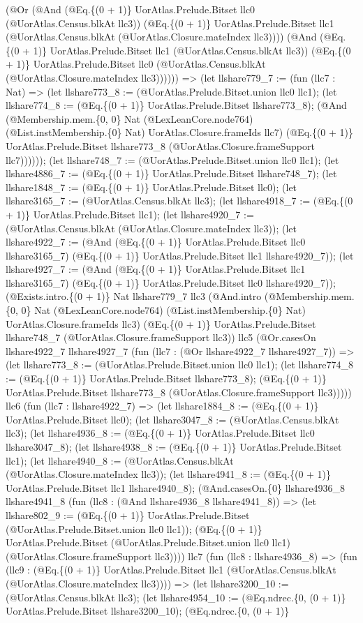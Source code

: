 \documentclass[11pt]{article}
\begin{document}
(@Or (@And (@Eq.\{(0 + 1)\} UorAtlas.Prelude.Bitset llc0 (@UorAtlas.Census.blkAt llc3)) (@Eq.\{(0 + 1)\} UorAtlas.Prelude.Bitset llc1 (@UorAtlas.Census.blkAt (@UorAtlas.Closure.mateIndex llc3)))) (@And (@Eq.\{(0 + 1)\} UorAtlas.Prelude.Bitset llc1 (@UorAtlas.Census.blkAt llc3)) (@Eq.\{(0 + 1)\} UorAtlas.Prelude.Bitset llc0 (@UorAtlas.Census.blkAt (@UorAtlas.Closure.mateIndex llc3)))))) => (let llshare779\_7 := (fun (llc7 : Nat) => (let llshare773\_8 := (@UorAtlas.Prelude.Bitset.union llc0 llc1); (let llshare774\_8 := (@Eq.\{(0 + 1)\} UorAtlas.Prelude.Bitset llshare773\_8); (@And (@Membership.mem.\{0, 0\} Nat (@LexLeanCore.node764) (@List.instMembership.\{0\} Nat) UorAtlas.Closure.frameIds llc7) (@Eq.\{(0 + 1)\} UorAtlas.Prelude.Bitset llshare773\_8 (@UorAtlas.Closure.frameSupport llc7)))))); (let llshare748\_7 := (@UorAtlas.Prelude.Bitset.union llc0 llc1); (let llshare4886\_7 := (@Eq.\{(0 + 1)\} UorAtlas.Prelude.Bitset llshare748\_7); (let llshare1848\_7 := (@Eq.\{(0 + 1)\} UorAtlas.Prelude.Bitset llc0); (let llshare3165\_7 := (@UorAtlas.Census.blkAt llc3); (let llshare4918\_7 := (@Eq.\{(0 + 1)\} UorAtlas.Prelude.Bitset llc1); (let llshare4920\_7 := (@UorAtlas.Census.blkAt (@UorAtlas.Closure.mateIndex llc3)); (let llshare4922\_7 := (@And (@Eq.\{(0 + 1)\} UorAtlas.Prelude.Bitset llc0 llshare3165\_7) (@Eq.\{(0 + 1)\} UorAtlas.Prelude.Bitset llc1 llshare4920\_7)); (let llshare4927\_7 := (@And (@Eq.\{(0 + 1)\} UorAtlas.Prelude.Bitset llc1 llshare3165\_7) (@Eq.\{(0 + 1)\} UorAtlas.Prelude.Bitset llc0 llshare4920\_7)); (@Exists.intro.\{(0 + 1)\} Nat llshare779\_7 llc3 (@And.intro (@Membership.mem.\{0, 0\} Nat (@LexLeanCore.node764) (@List.instMembership.\{0\} Nat) UorAtlas.Closure.frameIds llc3) (@Eq.\{(0 + 1)\} UorAtlas.Prelude.Bitset llshare748\_7 (@UorAtlas.Closure.frameSupport llc3)) llc5 (@Or.casesOn llshare4922\_7 llshare4927\_7 (fun (llc7 : (@Or llshare4922\_7 llshare4927\_7)) => (let llshare773\_8 := (@UorAtlas.Prelude.Bitset.union llc0 llc1); (let llshare774\_8 := (@Eq.\{(0 + 1)\} UorAtlas.Prelude.Bitset llshare773\_8); (@Eq.\{(0 + 1)\} UorAtlas.Prelude.Bitset llshare773\_8 (@UorAtlas.Closure.frameSupport llc3))))) llc6 (fun (llc7 : llshare4922\_7) => (let llshare1884\_8 := (@Eq.\{(0 + 1)\} UorAtlas.Prelude.Bitset llc0); (let llshare3047\_8 := (@UorAtlas.Census.blkAt llc3); (let llshare4936\_8 := (@Eq.\{(0 + 1)\} UorAtlas.Prelude.Bitset llc0 llshare3047\_8); (let llshare4938\_8 := (@Eq.\{(0 + 1)\} UorAtlas.Prelude.Bitset llc1); (let llshare4940\_8 := (@UorAtlas.Census.blkAt (@UorAtlas.Closure.mateIndex llc3)); (let llshare4941\_8 := (@Eq.\{(0 + 1)\} UorAtlas.Prelude.Bitset llc1 llshare4940\_8); (@And.casesOn.\{0\} llshare4936\_8 llshare4941\_8 (fun (llc8 : (@And llshare4936\_8 llshare4941\_8)) => (let llshare802\_9 := (@Eq.\{(0 + 1)\} UorAtlas.Prelude.Bitset (@UorAtlas.Prelude.Bitset.union llc0 llc1)); (@Eq.\{(0 + 1)\} UorAtlas.Prelude.Bitset (@UorAtlas.Prelude.Bitset.union llc0 llc1) (@UorAtlas.Closure.frameSupport llc3)))) llc7 (fun (llc8 : llshare4936\_8) => (fun (llc9 : (@Eq.\{(0 + 1)\} UorAtlas.Prelude.Bitset llc1 (@UorAtlas.Census.blkAt (@UorAtlas.Closure.mateIndex llc3)))) => (let llshare3200\_10 := (@UorAtlas.Census.blkAt llc3); (let llshare4954\_10 := (@Eq.ndrec.\{0, (0 + 1)\} UorAtlas.Prelude.Bitset llshare3200\_10); (@Eq.ndrec.\{0, (0 + 1)\} 
\end{document}
